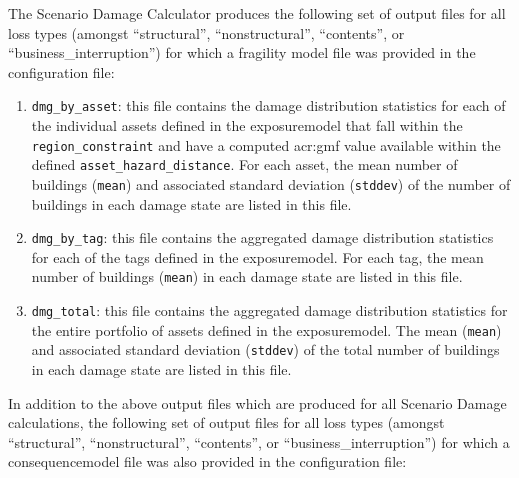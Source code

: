 The Scenario Damage Calculator produces the following set of output files for
all loss types (amongst ``structural'', ``nonstructural'', ``contents'', or
``business\_interruption'') for which a fragility model file was provided in
the configuration file:

\begin{enumerate}

  \item \Verb+dmg_by_asset+: this file contains the damage distribution
    statistics for each of the individual \glspl{asset} defined in the
    \gls{exposuremodel} that fall within the \Verb+region_constraint+ and have
    a computed \gls{acr:gmf} value available within the defined
    \Verb+asset_hazard_distance+. For each \gls{asset}, the mean number of
    buildings (\Verb+mean+) and associated standard deviation (\Verb+stddev+)
    of the number of buildings in each damage state are listed in this file.

  \item \Verb+dmg_by_tag+: this file contains the aggregated damage
    distribution statistics for each of the \glspl{tag} defined in the
    \gls{exposuremodel}. For each \gls{tag}, the mean number of
    buildings (\Verb+mean+) in each damage state are listed in this file.

  \item \Verb+dmg_total+: this file contains the aggregated damage
    distribution statistics for the entire portfolio of \glspl{asset} defined
    in the \gls{exposuremodel}. The mean (\Verb+mean+) and associated standard
    deviation (\Verb+stddev+) of the total number of buildings in each
    damage state are listed in this file.

\end{enumerate}

In addition to the above output files which are produced for all Scenario
Damage calculations, the following set of output files for all loss types
(amongst ``structural'', ``nonstructural'', ``contents'', or
``business\_interruption'') for which a \gls{consequencemodel} file was also
provided in the configuration file:

